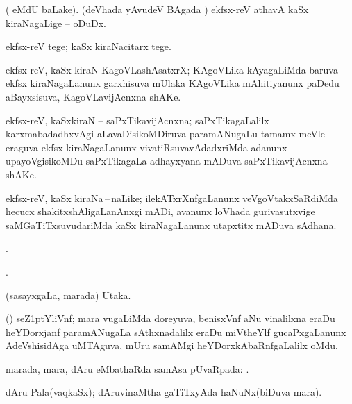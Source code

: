\bentry
{}
\gl{\sakirx} 
\bmng
( eMdU baLake). (deVhada yAvudeV BAgada \vi)
\banum
{} ekfsx-reV athavA kaSx kiraNagaLige -- oDuDx. 

 ekfsx-reV tege; kaSx kiraNacitarx tege.
\eanum
\emng
\eentry

\bentry
{}
\gl{\nA}
\bmng
ekfsx-reV, kaSx kiraN  KagoVLashAsatxrX; KAgoVLika kAyagaLiMda  baruva ekfsx kiraNagaLanunx  garxhisuva mUlaka KAgoVLika mAhitiyanunx  paDedu aBayxsisuva, KagoVLavijAcnxna shAKe. 
\emng 
\eentry

\bentry
{}
\gl{\nA}
\bmng
ekfsx-reV, kaSxkiraN -- saPxTikavijAcnxna; saPxTikagaLalilx karxmabadadhxvAgi aLavaDisikoMDiruva paramANugaLu  tamamx meVle eraguva ekfsx kiraNagaLanunx vivatiRsuvavAdadxriMda adanunx  upayoVgisikoMDu saPxTikagaLa adhayxyana mADuva saPxTikavijAcnxna shAKe.
\emng
\eentry

\bentry
{}
\gl{\nA} 
\bmng
ekfsx-reV, kaSx kiraNa\,--\,naLike; ilekATxrXnfgaLanunx  veVgoVtakxSaRdiMda hecucx shakitxshAligaLanAnxgi mADi, avanunx  loVhada gurivasutxvige saMGaTiTxsuvudariMda  kaSx kiraNagaLanunx  utapxtitx mADuva sAdhana.
\emng 
\eentry

\bentry
{}
\gl{\saMkiSx} 
\bmng
{}.
\emng
\eentry

\bentry
{}
\gl{\saMkiSx}
\bmng
{}.
\emng
\eentry

\bentry
{} 
\gl{\nA} 
\bmng
(sasayxgaLa, marada) Utaka.
\emng 
\eentry

\bentry
{} 
\gl{\nA}
\bmng
(\ravi) seZ\kern1ptYliVnf; mara \mo vugaLiMda doreyuva, benisxVnf aNu vinalilxna eraDu heYDorxjanf paramANugaLa sAthxnadalilx eraDu miVtheYlf  gucaPxgaLanunx AdeVshisidAga uMTAguva, mUru samAMgi heYDorxkAbaRnfgaLalilx oMdu.
\emng 
\eentry

\bentry
{} 
\gl{\sapUpa}
\bmng
marada, mara, dAru eMbathaRda samAsa pUvaRpada: .
\emng 
\eentry

\bentry
{} 
\gl{\nA} 
\bmng
dAru Pala(vaqkaSx); dAruvinaMtha gaTiTxyAda haNuNx(biDuva mara).
\emng
\eentry

